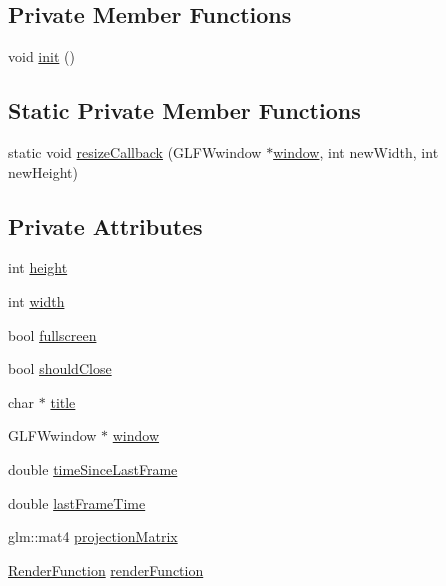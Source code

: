 \subsection*{Private Member Functions}
\begin{DoxyCompactItemize}
\item 
void \hyperlink{class_g_g_e_1_1_window_aa7c54d7337b0e13e6c0c5d9ed26249f3}{init} ()
\end{DoxyCompactItemize}
\subsection*{Static Private Member Functions}
\begin{DoxyCompactItemize}
\item 
static void \hyperlink{class_g_g_e_1_1_window_a5eec12b16162d1b350173d75489abbf4}{resize\+Callback} (G\+L\+F\+Wwindow $\ast$\hyperlink{class_g_g_e_1_1_window_aefa5259b62d603d83ebf8963a019d73b}{window}, int new\+Width, int new\+Height)
\end{DoxyCompactItemize}
\subsection*{Private Attributes}
\begin{DoxyCompactItemize}
\item 
int \hyperlink{class_g_g_e_1_1_window_a2aef17e23370755f4c3de24e527676ff}{height}
\item 
int \hyperlink{class_g_g_e_1_1_window_a5d878b7b885837f5062b516ecbdc22bf}{width}
\item 
bool \hyperlink{class_g_g_e_1_1_window_a43b2bb5a05e9f6d7af76086ce42145f2}{fullscreen}
\item 
bool \hyperlink{class_g_g_e_1_1_window_a0cba23a6e1296e5f1d539e87b177d678}{should\+Close}
\item 
char $\ast$ \hyperlink{class_g_g_e_1_1_window_a9430276ac4c0ddc7e04be71772af4670}{title}
\item 
G\+L\+F\+Wwindow $\ast$ \hyperlink{class_g_g_e_1_1_window_aefa5259b62d603d83ebf8963a019d73b}{window}
\item 
double \hyperlink{class_g_g_e_1_1_window_a4cea6995dfa84431c5169dd3208fbda8}{time\+Since\+Last\+Frame}
\item 
double \hyperlink{class_g_g_e_1_1_window_ab93d7f77e803a854ef5188d5ce039838}{last\+Frame\+Time}
\item 
glm\+::mat4 \hyperlink{class_g_g_e_1_1_window_acc1dfe541ecdf8c1ca08eec451ea7aba}{projection\+Matrix}
\item 
\hyperlink{namespace_g_g_e_ae2d6bfdcdfc2e210b6d827b4221a9dc4}{Render\+Function} \hyperlink{class_g_g_e_1_1_window_ac699c5d6c173adeea2f1e5cda44b8b9a}{render\+Function}
\end{DoxyCompactItemize}
